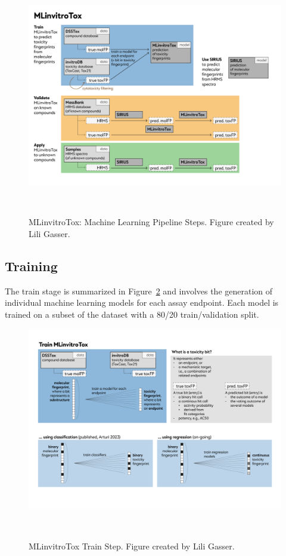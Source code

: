 \begin{figure}
    \centering
    \includegraphics[width=1.0\textwidth]{figures/Project_overview.png}
    \caption{MLinvitroTox: Machine Learning Pipeline Steps. Figure created by Lili Gasser.}
~\label{fig:Project_overview}
\end{figure}

\subsection{Training}
The train stage is summarized in Figure~\ref{fig:Project_overview_train} and involves the generation of individual machine learning models for each assay endpoint. Each model is trained on a subset of the dataset with a 80/20 train/validation split. 

\begin{figure} 
    \centering
    \includegraphics[width=1.0\textwidth]{figures/Project_overview_train.png}
    \caption{MLinvitroTox Train Step. Figure created by Lili Gasser.}
~\label{fig:Project_overview_train}
\end{figure}

